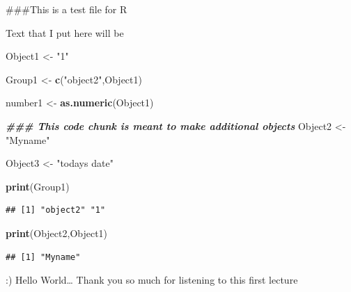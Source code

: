 \documentclass[
]{article}
\author{}
\date{\vspace{-2.5em}}
\newenvironment{Shaded}{\begin{snugshade}}{\end{snugshade}}
\newcommand{\DocumentationTok}[1]{\textcolor[rgb]{0.56,0.35,0.01}{\textbf{\textit{#1}}}}
\newcommand{\FunctionTok}[1]{\textcolor[rgb]{0.13,0.29,0.53}{\textbf{#1}}}
\newcommand{\NormalTok}[1]{#1}
\newcommand{\OtherTok}[1]{\textcolor[rgb]{0.56,0.35,0.01}{#1}}
\newcommand{\StringTok}[1]{\textcolor[rgb]{0.31,0.60,0.02}{#1}}
\begin{document}
\#\#\#This is a test file for R

Text that I put here will be

\begin{Shaded}
\begin{Highlighting}[]
\NormalTok{Object1 }\OtherTok{\textless{}{-}} \StringTok{"1"}

\NormalTok{Group1 }\OtherTok{\textless{}{-}} \FunctionTok{c}\NormalTok{(}\StringTok{"object2"}\NormalTok{,Object1)}
\end{Highlighting}
\end{Shaded}

\begin{Shaded}
\begin{Highlighting}[]
\NormalTok{number1 }\OtherTok{\textless{}{-}} \FunctionTok{as.numeric}\NormalTok{(Object1)}
\end{Highlighting}
\end{Shaded}

\begin{Shaded}
\begin{Highlighting}[]
\DocumentationTok{\#\#\# This code chunk is meant to make additional objects}
\NormalTok{Object2 }\OtherTok{\textless{}{-}} \StringTok{"Myname"}

\NormalTok{Object3 }\OtherTok{\textless{}{-}} \StringTok{"today\textquotesingle{}s date"}

\FunctionTok{print}\NormalTok{(Group1)}
\end{Highlighting}
\end{Shaded}

\begin{verbatim}
## [1] "object2" "1"
\end{verbatim}

\begin{Shaded}
\begin{Highlighting}[]
\FunctionTok{print}\NormalTok{(Object2,Object1)}
\end{Highlighting}
\end{Shaded}

\begin{verbatim}
## [1] "Myname"
\end{verbatim}

:) Hello World\ldots{} Thank you so much for listening to this first
lecture
\end{document}
